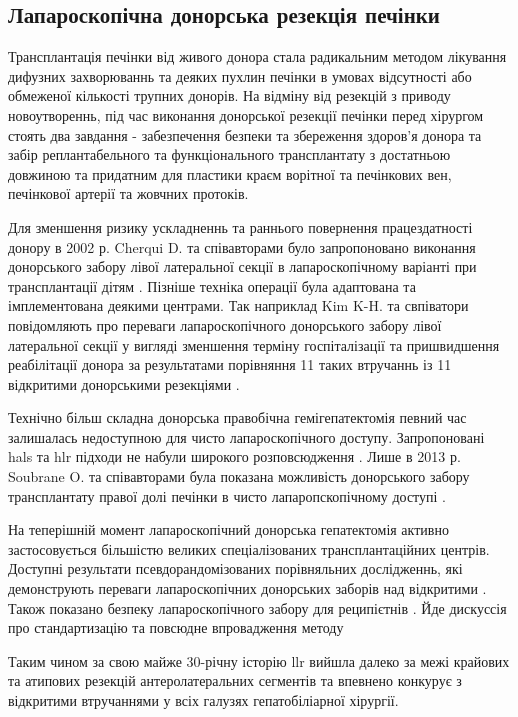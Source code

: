 \begin{refsection}
\subsection{Лапароскопічна донорська резекція печінки} 

Трансплантація печінки від живого донора стала радикальним методом лікування дифузних захворюваннь та деяких пухлин печінки в умовах відсутності або обмеженої кількості трупних донорів. На відміну від резекцій з приводу новоутвореннь, під час виконання донорської резекції печінки перед хірургом стоять два завдання -  забезпечення безпеки та збереження здоров'я донора та забір реплантабельного та функціонального трансплантату з достатньою довжиною та придатним для пластики краєм ворітної та печінкових вен, печінкової артерії та жовчних протоків. 

Для зменшення ризику ускладненнь та раннього повернення працездатності донору в 2002 р. Cherqui D. та співавторами було запропоновано виконання донорського забору лівої латеральної секції в лапароскопічному варіанті при трансплантації дітям \cite{Cherqui2002a}. Пізніше техніка операції була адаптована та імплементована деякими центрами. Так наприклад Kim K-H. та свпіватори повідомляють про переваги лапароскопічного донорського забору лівої латеральної секції у вигляді зменшення терміну госпіталізації та пришвидшення реабілітації донора за результатами порівняння 11 таких втручаннь із 11 відкритими донорськими резекціями \cite{Kim2011}. 

Технічно більш складна донорська правобічна гемігепатектомія певний час залишалась недоступною для чисто лапароскопічного доступу. Запропоновані \acrshort{hals} та \acrshort{hlr} підходи не набули широкого розповсюдження \cite{Koffron2006, Thenappan2011, Lin2013}. Лише в 2013 р. Soubrane O. та співавторами була показана можливість донорського забору трансплантату правої долі печінки в чисто лапаропскопічному доступі \cite{Soubrane2013}. 

На теперішній момент лапароскопічний донорська гепатектомія активно застосовується більшістю великих спеціалізованих трансплантаційних центрів. Доступні результати псевдорандомізованих порівняльних дослідженнь, які демонструють переваги лапароскопічних донорських заборів над відкритими \cite{Broering2018, Park2019a}. Також показано безпеку лапароскопічного забору для реципієтнів \cite{Kwon2018a}. Йде дискуссія про стандартизацію та повсюдне впровадження методу \cite{Au2018, Samstein2018}

Таким чином за свою майже 30-річну історію \acrshort{llr} вийшла далеко за межі крайових та атипових резекцій антеролатеральних сегментів та впевнено конкурує з відкритими втручаннями у всіх галузях гепатобіліарної хірургії. 



\end{refsection}
